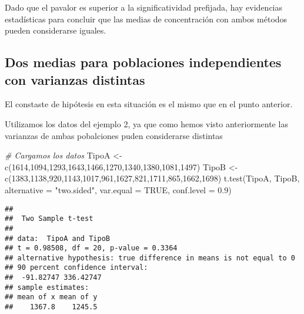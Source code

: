 \documentclass[
]{book}
\newenvironment{Shaded}{\begin{snugshade}}{\end{snugshade}}
\newcommand{\AttributeTok}[1]{\textcolor[rgb]{0.77,0.63,0.00}{#1}}
\newcommand{\CommentTok}[1]{\textcolor[rgb]{0.56,0.35,0.01}{\textit{#1}}}
\newcommand{\ConstantTok}[1]{\textcolor[rgb]{0.00,0.00,0.00}{#1}}
\newcommand{\DecValTok}[1]{\textcolor[rgb]{0.00,0.00,0.81}{#1}}
\newcommand{\FloatTok}[1]{\textcolor[rgb]{0.00,0.00,0.81}{#1}}
\newcommand{\FunctionTok}[1]{\textcolor[rgb]{0.00,0.00,0.00}{#1}}
\newcommand{\NormalTok}[1]{#1}
\newcommand{\OtherTok}[1]{\textcolor[rgb]{0.56,0.35,0.01}{#1}}
\newcommand{\StringTok}[1]{\textcolor[rgb]{0.31,0.60,0.02}{#1}}
\begin{document}
Dado que el pavalor es superior a la significatividad prefijada, hay evidencias estadísticas para concluir que las medias de concentración con ambos métodos pueden considerarse iguales.

\hypertarget{dos-medias-para-poblaciones-independientes-con-varianzas-distintas}{%
\subsection{Dos medias para poblaciones independientes con varianzas distintas}\label{dos-medias-para-poblaciones-independientes-con-varianzas-distintas}}

El constaste de hipótesis en esta situación es el mismo que en el punto anterior.

Utilizamos los datos del ejemplo 2, ya que como hemos visto anteriormente las varianzas de ambas pobalciones puden considerarse distintas

\begin{Shaded}
\begin{Highlighting}[]
\CommentTok{\# Cargamos los datos}
\NormalTok{TipoA }\OtherTok{\textless{}{-}} \FunctionTok{c}\NormalTok{(}\DecValTok{1614}\NormalTok{,}\DecValTok{1094}\NormalTok{,}\DecValTok{1293}\NormalTok{,}\DecValTok{1643}\NormalTok{,}\DecValTok{1466}\NormalTok{,}\DecValTok{1270}\NormalTok{,}\DecValTok{1340}\NormalTok{,}\DecValTok{1380}\NormalTok{,}\DecValTok{1081}\NormalTok{,}\DecValTok{1497}\NormalTok{)}
\NormalTok{TipoB }\OtherTok{\textless{}{-}} \FunctionTok{c}\NormalTok{(}\DecValTok{1383}\NormalTok{,}\DecValTok{1138}\NormalTok{,}\DecValTok{920}\NormalTok{,}\DecValTok{1143}\NormalTok{,}\DecValTok{1017}\NormalTok{,}\DecValTok{961}\NormalTok{,}\DecValTok{1627}\NormalTok{,}\DecValTok{821}\NormalTok{,}\DecValTok{1711}\NormalTok{,}\DecValTok{865}\NormalTok{,}\DecValTok{1662}\NormalTok{,}\DecValTok{1698}\NormalTok{)}
\FunctionTok{t.test}\NormalTok{(TipoA, TipoB, }\AttributeTok{alternative =} \StringTok{"two.sided"}\NormalTok{, }\AttributeTok{var.equal =} \ConstantTok{TRUE}\NormalTok{, }\AttributeTok{conf.level =} \FloatTok{0.9}\NormalTok{)}
\end{Highlighting}
\end{Shaded}

\begin{verbatim}
## 
##  Two Sample t-test
## 
## data:  TipoA and TipoB
## t = 0.98508, df = 20, p-value = 0.3364
## alternative hypothesis: true difference in means is not equal to 0
## 90 percent confidence interval:
##  -91.82747 336.42747
## sample estimates:
## mean of x mean of y 
##    1367.8    1245.5
\end{verbatim}
\end{document}
